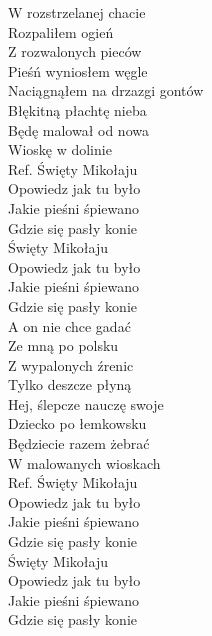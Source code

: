 
W rozstrzelanej chacie \tab{} \\
Rozpaliłem ogień \tab{} \\
Z rozwalonych pieców \tab{}\\
Pieśń wyniosłem węgle \tab{}\\
Naciągnąłem na drzazgi gontów \\
Błękitną płachtę nieba \tab{}\\
Będę malował od nowa \tab{}\\
Wioskę w dolinie \tab{}\\
\hops
Ref. Święty Mikołaju  \tab{}\\
 Opowiedz jak tu było \tab{}\\
 Jakie pieśni śpiewano \tab{}\\
 Gdzie się pasły konie \tab{}\\
 Święty Mikołaju \tab{}\\
 Opowiedz jak tu było \tab{}\\
 Jakie pieśni śpiewano \tab{} \\
 Gdzie się pasły konie \tab{}\\
\hops
A on nie chce gadać \\
Ze mną po polsku \\
Z wypalonych źrenic \\
Tylko deszcze płyną \\
Hej, ślepcze nauczę swoje \\
Dziecko po łemkowsku \\
Będziecie razem żebrać \\
W malowanych wioskach \\
\hops
Ref. Święty Mikołaju \\
 Opowiedz jak tu było \\
 Jakie pieśni śpiewano \\
 Gdzie się pasły konie \\
 Święty Mikołaju \\
 Opowiedz jak tu było \\
 Jakie pieśni śpiewano \\
 Gdzie się pasły konie